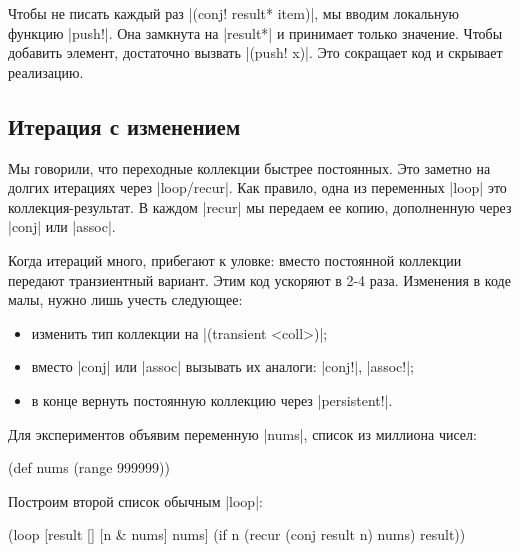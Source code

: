 Чтобы не писать каждый раз \spverb|(conj! result* item)|, мы
вводим локальную функцию \spverb|push!|. Она замкнута на \spverb|result*| и
принимает только значение. Чтобы добавить элемент, достаточно вызвать
\spverb|(push! x)|. Это сокращает код и скрывает реализацию.

\subsection{Итерация с изменением}

Мы говорили, что переходные коллекции быстрее постоянных. Это заметно на долгих
итерациях через \spverb|loop/recur|. Как правило, одна из переменных
\spverb|loop| это коллекция-результат. В каждом \spverb|recur| мы передаем ее
копию, дополненную через \spverb|conj| или \spverb|assoc|.

Когда итераций много, прибегают к уловке: вместо постоянной коллекции передают
транзиентный вариант. Этим код ускоряют в 2-4 раза. Изменения в коде малы,
нужно лишь учесть следующее:

\begin{itemize}

\item
  изменить тип коллекции на \spverb|(transient <coll>)|;

\item
  вместо \spverb|conj| или \spverb|assoc| вызывать их аналоги: \spverb|conj!|,
  \spverb|assoc!|;

\item
  в конце вернуть постоянную коллекцию через \spverb|persistent!|.

\end{itemize}

Для экспериментов объявим переменную \spverb|nums|, список из миллиона чисел:

\begin{english}
  \begin{clojure}
(def nums (range 999999))
  \end{clojure}
\end{english}

\noindent
Построим второй список обычным \spverb|loop|:

\begin{english}
  \begin{clojure}
(loop [result []
       [n & nums] nums]
  (if n
    (recur (conj result n) nums)
    result))
  \end{clojure}
\end{english}

